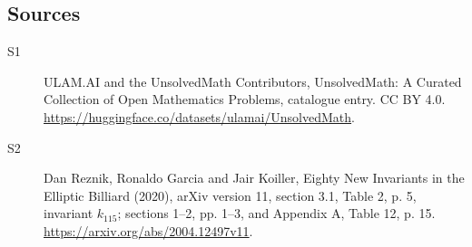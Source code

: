 \documentclass[11pt]{article}
\begin{document}
\subsection{Sources}
\begin{description}
\item[\hypertarget{source:statement:1}{S1}] ULAM.AI and the UnsolvedMath Contributors, UnsolvedMath: A Curated Collection of Open Mathematics Problems, catalogue entry. CC BY 4.0. \url{https://huggingface.co/datasets/ulamai/UnsolvedMath}.
\item[\hypertarget{source:statement:2}{S2}] Dan Reznik, Ronaldo Garcia and Jair Koiller, Eighty New Invariants in the Elliptic Billiard (2020), arXiv version 11, section 3.1, Table 2, p. 5, invariant $k_{115}$; sections 1--2, pp. 1--3, and Appendix A, Table 12, p. 15. \url{https://arxiv.org/abs/2004.12497v11}.
\end{description}
\label{end:statement}
\end{document}
